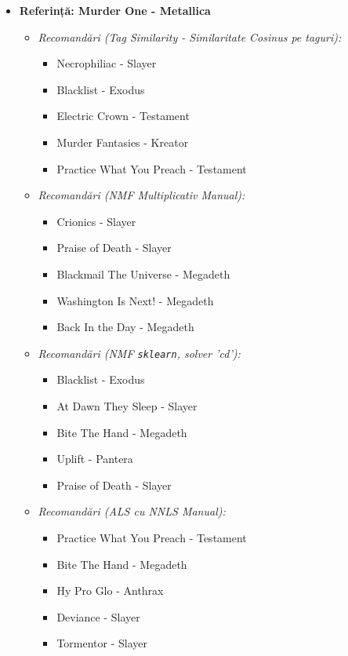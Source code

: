 \documentclass[12pt,a4paper]{article}
\begin{document}
	\begin{itemize}
		\item \textbf{Referință: Murder One - Metallica}
		\begin{itemize}
			\item \textit{Recomandări (Tag Similarity - Similaritate Cosinus pe taguri):}
			\begin{itemize}
				\item Necrophiliac - Slayer
				\item Blacklist - Exodus
				\item Electric Crown - Testament
				\item Murder Fantasies - Kreator
				\item Practice What You Preach - Testament
			\end{itemize}
			\vspace{0.5em}
			\item \textit{Recomandări (NMF Multiplicativ Manual):}
			\begin{itemize}
				\item Crionics - Slayer
				\item Praise of Death - Slayer
				\item Blackmail The Universe - Megadeth
				\item Washington Is Next! - Megadeth
				\item Back In the Day - Megadeth
			\end{itemize}
			\vspace{0.5em}
			\item \textit{Recomandări (NMF \texttt{sklearn}, solver 'cd'):}
			\begin{itemize}
				\item Blacklist - Exodus
				\item At Dawn They Sleep - Slayer
				\item Bite The Hand - Megadeth
				\item Uplift - Pantera
				\item Praise of Death - Slayer
			\end{itemize}
			\vspace{0.5em}
			\item \textit{Recomandări (ALS cu NNLS Manual):}
			\begin{itemize}
				\item Practice What You Preach - Testament
				\item Bite The Hand - Megadeth
				\item Hy Pro Glo - Anthrax
				\item Deviance - Slayer
				\item Tormentor - Slayer
			\end{itemize}
		\end{itemize}
	\end{itemize}
\end{document}
